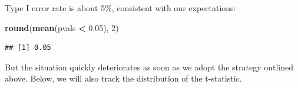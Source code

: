 \documentclass[12pt,]{krantz}
\newenvironment{Shaded}{\begin{snugshade}}{\end{snugshade}}
\newcommand{\CommentTok}[1]{\textcolor[rgb]{0.56,0.35,0.01}{\textit{#1}}}
\newcommand{\ControlFlowTok}[1]{\textcolor[rgb]{0.13,0.29,0.53}{\textbf{#1}}}
\newcommand{\DataTypeTok}[1]{\textcolor[rgb]{0.13,0.29,0.53}{#1}}
\newcommand{\DecValTok}[1]{\textcolor[rgb]{0.00,0.00,0.81}{#1}}
\newcommand{\FloatTok}[1]{\textcolor[rgb]{0.00,0.00,0.81}{#1}}
\newcommand{\KeywordTok}[1]{\textcolor[rgb]{0.13,0.29,0.53}{\textbf{#1}}}
\newcommand{\NormalTok}[1]{#1}
\newcommand{\OperatorTok}[1]{\textcolor[rgb]{0.81,0.36,0.00}{\textbf{#1}}}
\newcommand{\OtherTok}[1]{\textcolor[rgb]{0.56,0.35,0.01}{#1}}
\newcommand{\StringTok}[1]{\textcolor[rgb]{0.31,0.60,0.02}{#1}}
\begin{document}
\begin{Shaded}
\end{Shaded}

Type I error rate is about 5\%, consistent with our expectations:

\begin{Shaded}
\begin{Highlighting}[]
\KeywordTok{round}\NormalTok{(}\KeywordTok{mean}\NormalTok{(pvals }\OperatorTok{<}\StringTok{ }\FloatTok{0.05}\NormalTok{), }\DecValTok{2}\NormalTok{)}
\end{Highlighting}
\end{Shaded}

\begin{verbatim}
## [1] 0.05
\end{verbatim}

But the situation quickly deteriorates as soon as we adopt the strategy outlined above. Below, we will also track the distribution of the t-statistic.
\end{document}

